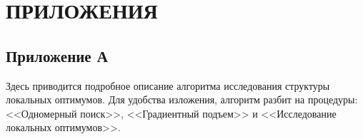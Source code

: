\chapter*{ПРИЛОЖЕНИЯ}
\section*{Приложение А}\label{sec:applic_a}
Здесь приводится подробное описание алгоритма исследования структуры локальных оптимумов. Для удобства изложения, алгоритм разбит
на процедуры: <<Одномерный поиск>>, <<Градиентный подъем>> и <<Исследование локальных оптимумов>>.
\\ \\


